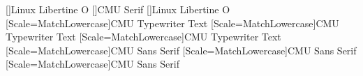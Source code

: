 \usepackage[russian,croatian,indonesian]{babel}
[]{Linux Libertine O}
[]{CMU Serif}
[]{Linux Libertine O}
[Scale=MatchLowercase]{CMU Typewriter Text}
[Scale=MatchLowercase]{CMU Typewriter Text}
[Scale=MatchLowercase]{CMU Typewriter Text}
[Scale=MatchLowercase]{CMU Sans Serif}
[Scale=MatchLowercase]{CMU Sans Serif}
[Scale=MatchLowercase]{CMU Sans Serif}
